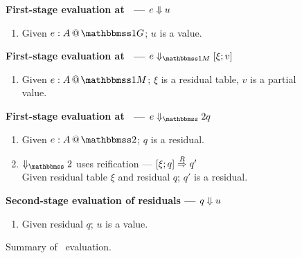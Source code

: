 
\begin{figure}
\begin{abstrsyn}

\textbf{First-stage evaluation at \bbonep\ ---
${e} \Downarrow {u}$}
\begin{enumerate}
\item[] Given $\colpure e A$;
$u$ is a value.
\end{enumerate}

\textbf{First-stage evaluation at \bbonem\ ---
$\diaone e {\xi;v}$}
\begin{enumerate}
\item[] Given $\colmix e A$;
$\xi$ is a residual table, 
$v$ is a partial value.
\end{enumerate}

\textbf{First-stage evaluation at \bbtwo\ ---
$\diatwo e q$}
\begin{enumerate}
\item[] Given $\coltwo e A$;
$q$ is a residual.
\item[] $\redtwosym$ uses reification --- $[{\xi};{q}]\overset{R}\Rightarrow{q}'$ \\
Given residual table $\xi$ and residual $q$; $q'$ is a residual.
\end{enumerate}

\textbf{Second-stage evaluation of residuals ---
${q} \Downarrow {u}$}
\begin{enumerate}
\item[] Given residual $q$;
$u$ is a value.
\end{enumerate}

\end{abstrsyn}
\caption{Summary of \lang\ evaluation.}
\label{fig:dynamicsSummary}
\end{figure}

